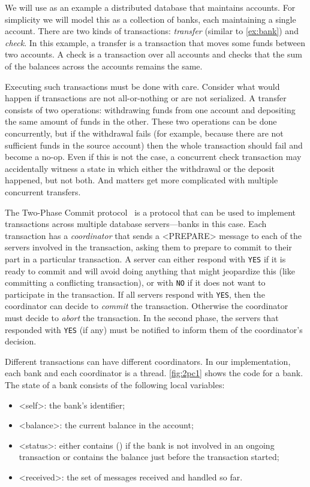 \documentclass{report}
\begin{document}
We will use as an example a distributed database that maintains accounts.
For simplicity we will model this as a collection of banks, each maintaining a
single account.  There are two kinds of transactions: \emph{transfer}
(similar to \autoref{ex:bank}) and \emph{check}.  In this example, a transfer
is a transaction that moves some funds between two accounts.
A check is a transaction over all accounts and checks that the sum of the
balances across the accounts remains the same.

Executing such transactions must be done with care.  Consider what
would happen if transactions are not all-or-nothing or are not
serialized.  A transfer consists of two operations: withdrawing
funds from one account and depositing the same amount of funds in
the other.  These two operations can be done concurrently, but if
the withdrawal fails (for example, because there are not sufficient
funds in the source account) then the whole transaction should fail
and become a no-op.  Even if this is not the case, a concurrent
check transaction may accidentally witness a state in which either
the withdrawal or the deposit happened, but not both.  And matters
get more complicated with multiple concurrent transfers.

The Two-Phase Commit protocol~\cite{Gray78} is a protocol that can be
used to implement transactions across multiple database servers---banks
in this case.
Each transaction has a \emph{coordinator} that sends a <{PREPARE}>
message to each of the servers involved in the transaction, asking them
to prepare to commit to their part in a particular transaction.
A server can either respond with
\texttt{YES} if it is ready to commit and will avoid doing anything
that might jeopardize this (like committing a conflicting transaction),
or with \texttt{NO} if it does not want to participate in the transaction.
If all servers respond with \texttt{YES}, then the coordinator can
decide to \emph{commit} the transaction.  Otherwise the coordinator
must decide to \emph{abort} the transaction.  In the second phase, the
servers that responded with \texttt{YES} (if any) must be notified
to inform them of the coordinator's decision.

Different transactions can have different coordinators.  In our
implementation, each bank and each coordinator is a thread.
\autoref{fig:2pc1} shows the code for a bank.
The state of a bank consists of the following local variables:
\begin{itemize}
\item <{self}>: the bank's identifier;
\item <{balance}>: the current balance in the account;
\item <{status}>: either contains () if the bank is not involved in an
ongoing transaction or contains the balance
just before the transaction started;
\item <{received}>: the set of messages received and handled so far.
\end{itemize}
\end{document}
